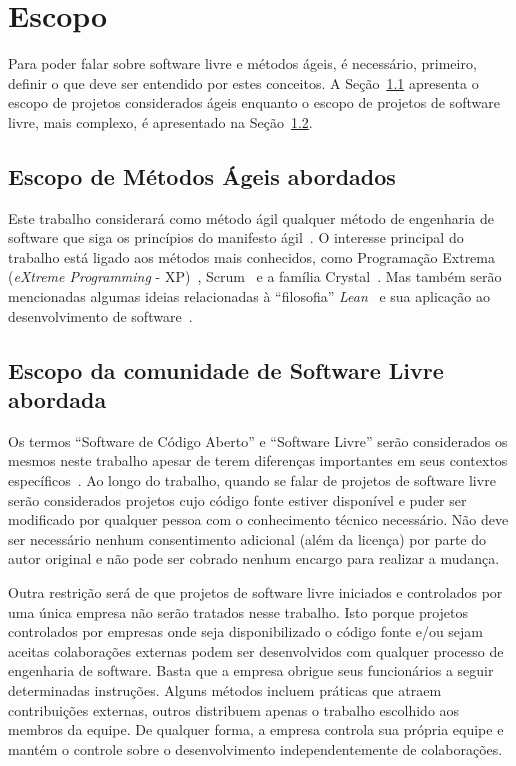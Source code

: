 \chapter{Escopo}
\label{cap:escopo}

Para poder falar sobre software livre e métodos ágeis, é necessário,
primeiro, definir o que deve ser entendido por estes conceitos. A
Seção~\ref{sec:agile-def} apresenta o escopo de projetos considerados
ágeis enquanto o escopo de projetos de software livre, mais
complexo, é apresentado na Seção~\ref{sec:os-def}.

\section{Escopo de Métodos Ágeis abordados}
\label{sec:agile-def}

Este trabalho considerará como método ágil qualquer método de
engenharia de software que siga os princípios do manifesto
ágil~\cite{AgileManifesto}. O interesse principal do trabalho está
ligado aos métodos mais conhecidos, como Programação Extrema
(\emph{eXtreme Programming} - XP)~\cite{XP02},
Scrum~\cite{Schwaber2004} e a família Crystal~\cite{Cockburn2002}. Mas
também serão mencionadas algumas ideias relacionadas à ``filosofia''
\emph{Lean}~\cite{Ohno1998} e sua aplicação ao desenvolvimento de
software~\cite{Poppendieck2005}.

\section{Escopo da comunidade de Software Livre abordada}
\label{sec:os-def}

Os termos ``Software de Código Aberto'' e ``Software Livre'' serão
considerados os mesmos neste trabalho apesar de terem diferenças
importantes em seus contextos específicos~\cite[Ch. 1, Free Versus
Open source]{Fogel2005}. Ao longo do trabalho, quando se falar de
projetos de software livre serão considerados projetos cujo código
fonte estiver disponível e puder ser modificado por qualquer pessoa
com o conhecimento técnico necessário. Não deve ser necessário nenhum
consentimento adicional (além da licença) por parte do autor original
e não pode ser cobrado nenhum encargo para realizar a mudança.

Outra restrição será de que projetos de software livre iniciados e
controlados por uma única empresa não serão tratados nesse
trabalho. Isto porque projetos controlados por empresas onde seja
disponibilizado o código fonte e/ou sejam aceitas colaborações
externas podem ser desenvolvidos com qualquer processo de engenharia
de software. Basta que a empresa obrigue seus funcionários a seguir
determinadas instruções. Alguns métodos incluem práticas que atraem
contribuições externas, outros distribuem apenas o trabalho escolhido
aos membros da equipe. De qualquer forma, a empresa controla sua
própria equipe e mantém o controle sobre o desenvolvimento
independentemente de colaborações.

